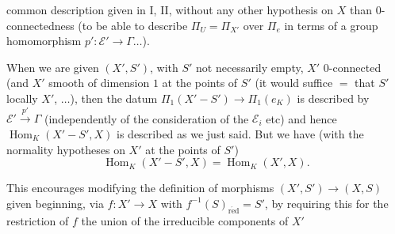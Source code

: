 common description given in I, II, without any other hypothesis on $X$ than  $0$-connectedness (to be able to describe $\Pi_U=\Pi_{X'}$ over $\Pi_e$ in terms of a group homomorphism $p':\mathcal E'\longrightarrow\Gamma\ldots$).

When we are given $(X',S')$, with $S'$ not necessarily empty, $X'$ $0$-connected (and  $X'$ smooth of dimension $1$ at the points of $S'$ (it would suffice $=$ that $S'$   locally  $X'$, $\ldots$),
then the  datum
$\Pi_1(X'-S')\longrightarrow\Pi_1(e_K)$ is described  by $\mathcal E'\xrightarrow{p'}\Gamma$ (independently of the consideration of the $\mathcal E_i$ etc) and hence $\operatorname{Hom}_K(X'-S',X)$ is described as we just said.
But we have (with the normality hypotheses on $X'$ at the points of $S'$)
\[
\operatorname{Hom}_K(X'-S',X)=\operatorname{Hom}_K(X',X).
\]

This encourages modifying the definition of morphisms $(X',S')\longrightarrow(X,S)$ given  beginning, via $f:X'\longrightarrow X$ with $f^{-1}(S)_{\mathrm{r\acute ed}}=S'$, by requiring this   for the restriction of $f$  the union of the irreducible components of $X'$
